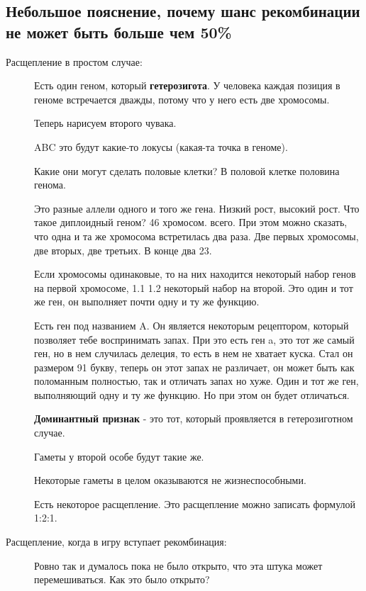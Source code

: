 \subsection{Небольшое пояснение, почему шанс рекомбинации не может быть больше чем 50\%}

\begin{description}
\item[Расщепление в простом случае:]
Есть один геном, который \textbf{гетерозигота}. У человека каждая 
позиция в геноме встречается дважды, потому что 
у него есть две хромосомы. 

Теперь нарисуем второго чувака. 

ABC это будут какие-то локусы (какая-та точка в геноме). 

Какие они могут сделать половые клетки? 
В половой клетке половина генома. 

Это разные аллели одного и того же гена. Низкий рост, высокий рост. 
Что такое диплоидный геном? 46 хромосом. всего. При этом 
можно сказать, что одна и та же хромосома встретилась два раза. 
Две первых хромосомы, две вторых, две третьих. В конце два 23. 

Если хромосомы одинаковые, то на них находится некоторый набор генов на первой 
хромосоме, 
1.1
1.2 
некоторый набор на второй. Это один и тот же ген, он выполняет почти одну и ту же функцию. 

Есть ген под названием A. Он является некоторым рецептором, который 
позволяет тебе воспринимать запах. При это есть 
ген a, это тот же самый ген, но в нем случилась делеция, то есть 
в нем не хватает куска. Стал он размером 91 букву, теперь 
он этот запах не различает, он может быть как 
поломанным полностью, так и отличать 
запах но хуже. Один и тот же ген, выполняющий одну и ту же 
функцию. Но при этом он будет отличаться. 

\textbf{Доминантный признак} - это тот, который 
проявляется в гетерозиготном случае. 

Гаметы у второй особе будут такие же. 

Некоторые гаметы в целом оказываются не жизнеспособными. 

\TODO %

Есть некоторое 
расщепление. Это расщепление можно записать формулой 1:2:1.

\item[Расщепление, когда в игру вступает рекомбинация:]

Ровно так и думалось пока не было открыто, что 
эта штука может перемешиваться. Как 
это было открыто? 


\end{description}
